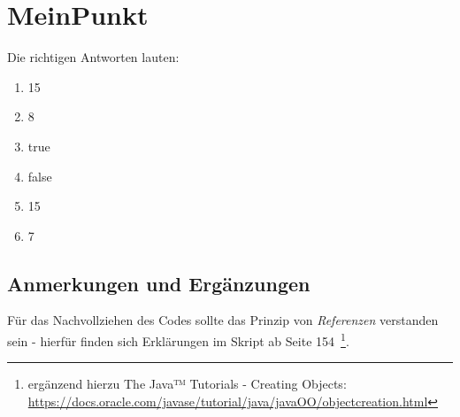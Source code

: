 \chapter{MeinPunkt}

Die richtigen Antworten lauten:

\begin{enumerate}
    \item 15
    \item 8
    \item true
    \item false
    \item 15
    \item 7
\end{enumerate}


\section*{Anmerkungen und Ergänzungen}

Für das Nachvollziehen des Codes sollte das Prinzip von \textit{Referenzen} verstanden sein - hierfür finden sich
Erklärungen im Skript ab Seite 154~\footnote{
    ergänzend hierzu The Java™ Tutorials - Creating Objects: \url{https://docs.oracle.com/javase/tutorial/java/javaOO/objectcreation.html}
}.